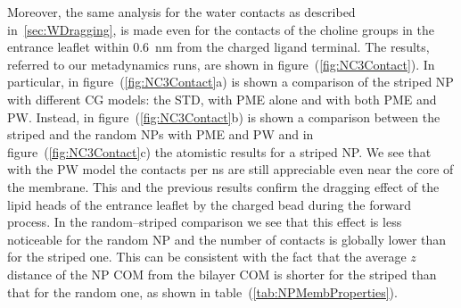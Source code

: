 Moreover, the same analysis for the water contacts as described in~\ref{sec:WDragging}, is made even for the contacts of the choline groups in the entrance leaflet within $0.6$~nm from the charged ligand terminal. The results, referred to our metadynamics runs, are shown in figure~(\ref{fig:NC3Contact}). In particular, in figure~(\ref{fig:NC3Contact}a) is shown a comparison of the striped \ac{NP} with different \ac{CG} \martini models: the \ac{STD}, with \ac{PME} alone and with both \ac{PME} and \ac{PW}. Instead, in figure~(\ref{fig:NC3Contact}b) is shown a comparison between the striped and the random \acp{NP} with \ac{PME} and \ac{PW} and in figure~(\ref{fig:NC3Contact}c) the atomistic results for a striped \ac{NP}. We see that with the \ac{PW} model the contacts per ns are still appreciable even near the core of the membrane. This and the previous results confirm the dragging effect of the lipid heads of the entrance leaflet by the charged bead during the forward process. In the random--striped comparison we see that this effect is less noticeable for the random \ac{NP} and the number of contacts is globally lower than for the striped one. This can be consistent with the fact that the average $z$ distance of the \ac{NP} \ac{COM} from the bilayer \ac{COM} is shorter for the striped than that for the random one, as shown in table~(\ref{tab:NPMembProperties}). 

\clearpage

